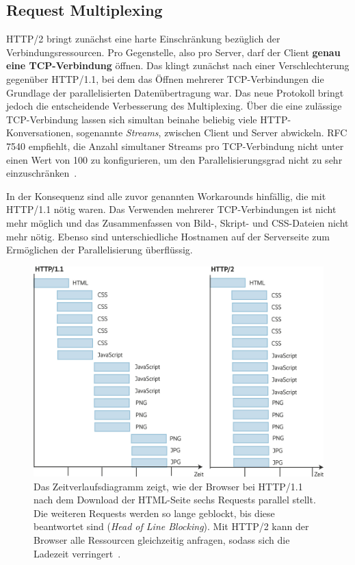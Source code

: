 \documentclass[a4paper, justified, notoc]{tufte-handout} %
\begin{document}
\subsection{Request Multiplexing} %
\label{sub:request_multiplexing}
HTTP/2 bringt zunächst eine harte Einschränkung bezüglich der Verbindungsressourcen. Pro Gegenstelle, also pro Server, darf der Client \textbf{genau eine TCP-Verbindung} öffnen. Das klingt zunächst nach einer Verschlechterung gegenüber HTTP/1.1, bei dem das Öffnen mehrerer TCP-Verbindungen die Grundlage der parallelisierten Datenübertragung war. Das neue Protokoll bringt jedoch die entscheidende Verbesserung des Multiplexing. Über die eine zulässige TCP-Verbindung lassen sich simultan beinahe beliebig viele HTTP-Konversationen, sogenannte \emph{Streams}, zwischen Client und Server abwickeln. RFC 7540 empfiehlt, die Anzahl simultaner Streams pro TCP-Verbindung nicht unter einen Wert von 100 zu konfigurieren, um den Parallelisierungsgrad nicht zu sehr einzuschränken~\citep{weinschenkler:2017}.

In der Konsequenz sind alle zuvor genannten Workarounds hinfällig, die mit HTTP/1.1 nötig waren. Das Verwenden mehrerer TCP-Verbindungen ist nicht mehr möglich und das Zusammenfassen von Bild-, Skript- und CSS-Dateien nicht mehr nötig. Ebenso sind unterschiedliche Hostnamen auf der Serverseite zum Ermöglichen der Parallelisierung überflüssig.

\begin{figure}%
	\centering
  \includegraphics[width=1\textwidth]{./figures/head_of_line_blocking.jpg}
  \caption{Das Zeitverlaufsdiagramm zeigt, wie der Browser bei HTTP/1.1 nach dem Download der HTML-Seite sechs Requests parallel stellt. Die weiteren Requests werden so lange geblockt, bis diese beantwortet sind (\emph{Head of Line Blocking}). Mit HTTP/2 kann der Browser alle Ressourcen gleichzeitig anfragen, sodass sich die Ladezeit verringert~\citep{heise:2018}.}
  \label{fig:head_of_line_blocking}
\end{figure}
\end{document}
